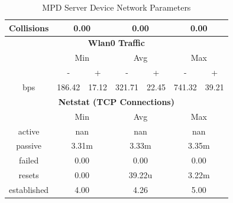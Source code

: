 \documentclass[11pt,a4paper,headinclude=false,footinclude=false]{scrreprt}
\begin{document}
\begin{table}[H]
\begin{tabular}{||c|c|c|c|c|c|c||}
    \hline
    Collisions & \multicolumn{2}{|c|}{0.00} & \multicolumn{2}{|c|}{0.00} & \multicolumn{2}{|c|}{0.00} \\
    \hline\hline
    \multicolumn{7}{|c|}{\textbf{Wlan0 Traffic}} \\
    \hline\hline
      & \multicolumn{2}{|c|}{Min} & \multicolumn{2}{|c|}{Avg} & \multicolumn{2}{|c|}{Max} \\
    \hline
      & - & + & - & + & - & + \\
    \hline
    bps  & 186.42 & 17.12 & 321.71 & 22.45 & 741.32 & 39.21 \\
    \hline\hline
    \multicolumn{7}{|c|}{\textbf{Netstat (TCP Connections)}} \\
    \hline\hline
      & \multicolumn{2}{|c|}{Min} & \multicolumn{2}{|c|}{Avg} & \multicolumn{2}{|c|}{Max} \\
    \hline
    active & \multicolumn{2}{|c|}{nan} & \multicolumn{2}{|c|}{nan} & \multicolumn{2}{|c|}{nan} \\
    \hline
    passive & \multicolumn{2}{|c|}{3.31m} & \multicolumn{2}{|c|}{3.33m} & \multicolumn{2}{|c|}{3.35m} \\
    \hline
    failed & \multicolumn{2}{|c|}{0.00} & \multicolumn{2}{|c|}{0.00} & \multicolumn{2}{|c|}{0.00} \\
    \hline
    resets & \multicolumn{2}{|c|}{0.00} & \multicolumn{2}{|c|}{39.22u} & \multicolumn{2}{|c|}{3.22m} \\
    \hline
    established & \multicolumn{2}{|c|}{4.00} & \multicolumn{2}{|c|}{4.26} & \multicolumn{2}{|c|}{5.00} \\
    \hline\hline
    \end{tabular}
    \caption{MPD Server Device Network Parameters}
    \label{MPDserverNetTab}
\end{table}
\end{document}
